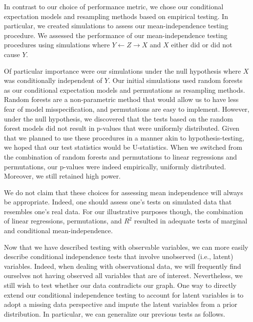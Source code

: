 In contrast to our choice of performance metric, we chose our conditional expectation models and resampling methods based on empirical testing.
In particular, we created simulations to assess our mean-independence testing procedure.
We assessed the performance of our mean-independence testing procedures using simulations where $Y \leftarrow Z \rightarrow X$ and $X$ either did or did not cause $Y$.

Of particular importance were our simulations under the null hypothesis where $X$ was conditionally independent of $Y$.
Our initial simulations used random forests as our conditional expectation models and permutations as resampling methods.
Random forests are a non-parametric method that would allow us to have less fear of model misspecification, and permutations are easy to implement.
However, under the null hypothesis, we discovered that the tests based on the random forest models did not result in p-values that were uniformly distributed.
Given that we planned to use these procedures in a manner akin to hypothesis-testing, we hoped that our test statistics would be U-statistics.
When we switched from the combination of random forests and permutations to linear regressions and permutations, our p-values were indeed empirically, uniformly distributed.
Moreover, we still retained high power.

We do not claim that these choices for assessing mean independence will always be appropriate.
Indeed, one should assess one's tests on simulated data that resembles one's real data.
For our illustrative purposes though, the combination of linear regressions, permutations, and $R^2$ resulted in adequate tests of marginal and conditional mean-independence.

Now that we have described testing with observable variables, we can more easily describe conditional independence tests that involve unobserved (i.e., latent) variables.
Indeed, when dealing with observational data, we will frequently find ourselves not having observed all variables that are of interest.
Nevertheless, we still wish to test whether our data contradicts our graph.
One way to directly extend our conditional independence testing to account for latent variables is to adopt a missing data perspective and impute the latent variables from a prior distribution.
In particular, we can generalize our previous tests as follows.

